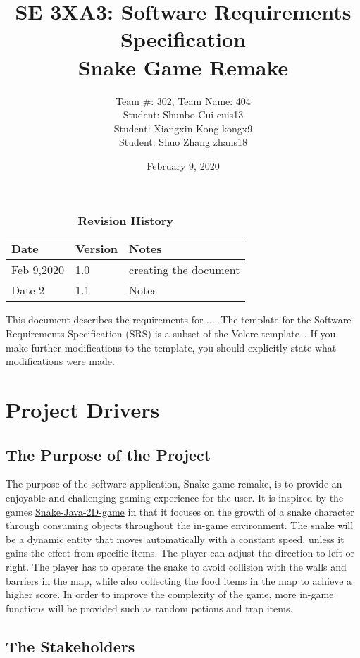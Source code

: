 \documentclass[12pt, titlepage]{article}
\title{SE 3XA3: Software Requirements Specification\\\textbf{Snake Game Remake}}
\author{Team \#: 302, Team Name: 404
		\\ Student: Shunbo Cui	cuis13
		\\ Student: Xiangxin Kong	kongx9
		\\ Student: Shuo Zhang	zhans18
}
\date{February 9, 2020}
\begin{document}
\maketitle
{}
\tableofcontents
\listoftables
\listoffigures

\begin{table}[bp]
\caption{\bf Revision History}
\begin{tabularx}{\textwidth}{p{3cm}p{2cm}X}
\toprule {\bf Date} & {\bf Version} & {\bf Notes}\\
\midrule
Feb 9,2020 & 1.0 & creating the document\\
Date 2 & 1.1 & Notes\\
\bottomrule
\end{tabularx}
\end{table}

\newpage


This document describes the requirements for ....  The template for the Software
Requirements Specification (SRS) is a subset of the Volere
template~\citep{RobertsonAndRobertson2012}.  If you make further modifications
to the template, you should explicitly state what modifications were made.

\section{Project Drivers}

\subsection{The Purpose of the Project}
The purpose of the software application, Snake-game-remake, is to provide an enjoyable and challenging gaming experience for the user. It is inspired by the games \href{https://github.com/mtala3t/Snake-Java-2D-Game}{Snake-Java-2D-game} in that it focuses on the growth of a snake character through consuming objects throughout the in-game environment. The snake will be a dynamic entity that moves automatically with a constant speed, unless it gains the effect from specific items. The player can adjust the direction to left or right. The player has to operate the snake to avoid collision with the walls and barriers in the map, while also collecting the food items in the map to achieve a higher score. In order to improve the complexity of the game, more in-game functions will be provided such as random potions and trap items.
\subsection{The Stakeholders}
\end{document}
